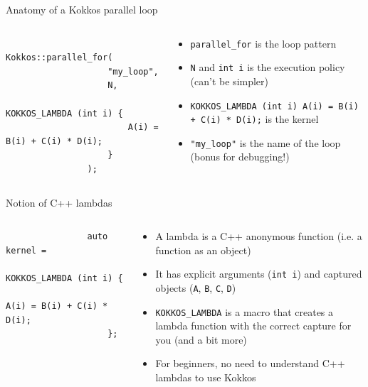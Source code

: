 \documentclass[aspectratio=169]{beamer}
\begin{document}
\begin{frame}[fragile]{Anatomy of a Kokkos parallel loop}
    \begin{columns}
        \begin{column}{0.5\linewidth}
            \begin{verbatim}
                Kokkos::parallel_for(
                    "my_loop",
                    N,
                    KOKKOS_LAMBDA (int i) {
                        A(i) = B(i) + C(i) * D(i);
                    }
                );
            \end{verbatim}
        \end{column}
        \begin{column}{0.5\linewidth}
            \begin{itemize}
                \item \texttt{parallel_for} is the loop pattern
                \item \texttt{N} and \texttt{int i} is the execution policy (can't be simpler)
                \item \texttt{KOKKOS_LAMBDA (int i) {A(i) = B(i) + C(i) * D(i);}} is the kernel
                \item \texttt{"my_loop"} is the name of the loop (bonus for debugging!)
            \end{itemize}
        \end{column}
    \end{columns}
\end{frame}


\begin{frame}[fragile]{Notion of C++ lambdas}
    \begin{columns}
        \begin{column}{0.5\linewidth}
            \begin{verbatim}
                auto kernel =
                    KOKKOS_LAMBDA (int i) {
                        A(i) = B(i) + C(i) * D(i);
                    };
            \end{verbatim}
        \end{column}
        \begin{column}{0.5\linewidth}
            \begin{itemize}
                \item A lambda is a C++ anonymous function (i.e. a function as an object)
                \item It has explicit arguments (\texttt{int i}) and captured objects (\texttt{A}, \texttt{B}, \texttt{C}, \texttt{D})
                \item \texttt{KOKKOS\_LAMBDA} is a macro that creates a lambda function with the correct capture for you (and a bit more)
                \item For beginners, no need to understand C++ lambdas to use Kokkos
            \end{itemize}
        \end{column}
    \end{columns}
\end{frame}
\end{document}
